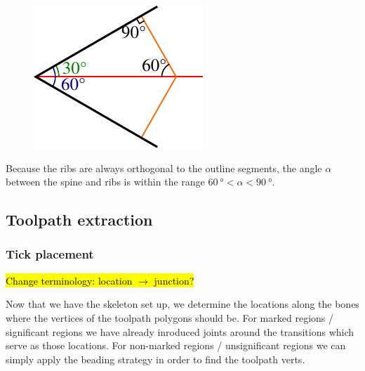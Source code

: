 \begin{figure}
\begin{center}
\includegraphics[width=\linewidth]{sources/method/min_angle_of_introduced_bones.pdf}
\end{center}
\end{figure}

Because the ribs are always orthogonal to the outline segments, the angle $\alpha$ between the spine and ribs is within the range $\SI{60}{\degree} < \alpha < \SI{90}{\degree}$.











\subsection{Toolpath extraction}

\subsubsection{Tick placement}
\hl{Change terminology: location $\to$ junction?}

Now that we have the skeleton set up, we determine the locations along the bones where the vertices of the toolpath polygons should be.
For marked regions / significant regions we have already inroduced joints around the transitions which serve as those locations.
For non-marked regions / unsignificant regions we can simply apply the beading strategy in order to find the toolpath verts.


